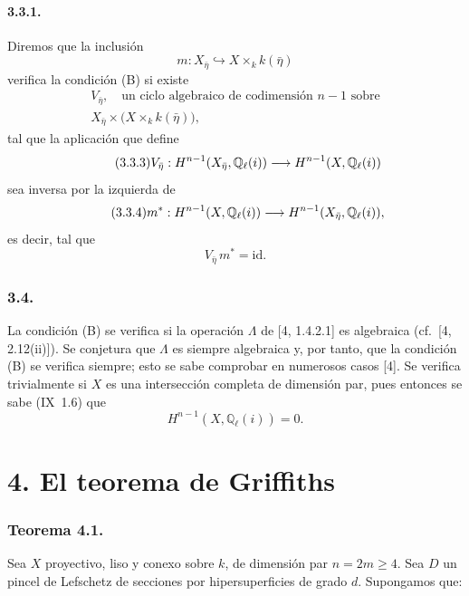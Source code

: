 \paragraph{3.3.1.}
Diremos que la inclusión
\begin{equation*}
m:X_{\bar\eta}\hookrightarrow X\times_k k(\bar\eta)
\end{equation*}
verifica la condición (B) si existe
\begin{equation}\tag{3.3.2}
\begin{gathered}
V_{\bar\eta},\quad\text{un ciclo algebraico de codimensión $n-1$ sobre}\\
X_{\bar\eta}\times\bigl(X\times_k k(\bar\eta)\bigr),
\end{gathered}
\end{equation}
tal que la aplicación que define
\begin{equation}\tag{3.3.3}
V_{\bar\eta}\sisi{;}{:}H^{n-1}(X_{\bar\eta},\mathbb Q_\ell(i))
\longrightarrow H^{n-1}(X,\mathbb Q_\ell(i))
\end{equation}
sea inversa por la izquierda de
\begin{equation}\tag{3.3.4}
m^*:H^{n-1}(X,\mathbb Q_\ell(i))
\longrightarrow H^{n-1}(X_{\sisi{\eta}{\bar\eta}},\mathbb Q_\ell(i)),
\end{equation}
es decir, tal que
\begin{equation}\tag{3.3.5}
V_{\bar\eta}\,m^*=\mathrm{id}.
\end{equation}

\subsubsection*{3.4.}
La condición (B) se verifica si la operación $\Lambda$ de [4, 1.4.2.1]
es algebraica (cf.~[4, 2.12(ii)]). Se conjetura que $\Lambda$ es siempre
algebraica y, por tanto, que la condición (B) se verifica siempre; esto
se sabe comprobar en numerosos casos [4]. Se verifica trivialmente si
$X$ es una intersección completa de dimensión par, pues entonces se sabe
(IX~1.6) que
\begin{equation}\tag{3.4.1}
H^{n-1}(X,\mathbb Q_\ell(i))=0.
\end{equation}

\pageoriginale

\section*{4. El teorema de Griffiths}

\subsubsection*{Teorema 4.1.}
Sea $X$ proyectivo, liso y conexo sobre $k$, de dimensión par
$n=2m\geq4$. Sea $D$ un pincel de Lefschetz de secciones por
hipersuperficies de grado $d$. Supongamos que:


